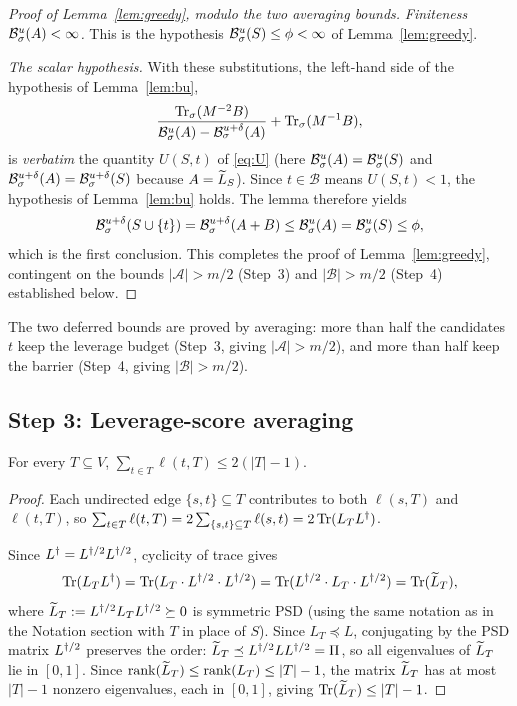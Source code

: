 \begin{proof}[Proof of Lemma~\ref{lem:greedy}, modulo the two averaging bounds]
\emph{Finiteness $\mathcal{B}^{u}_{\sigma}(A)<\infty$.} This is the hypothesis
$\mathcal{B}^{u}_{\sigma}(S)\le\phi<\infty$ of Lemma~\ref{lem:greedy}.

\emph{The scalar hypothesis.} With these substitutions, the left-hand side of
the hypothesis of Lemma~\ref{lem:bu},
\[
  \frac{\operatorname{Tr}_{\sigma}(M^{-2}B)}{\mathcal{B}^{u}_{\sigma}(A)-\mathcal{B}^{u+\delta}_{\sigma}(A)}
   + \operatorname{Tr}_{\sigma}(M^{-1}B),
\]
is \emph{verbatim} the quantity $U(S,t)$ of \eqref{eq:U}
(here $\mathcal{B}^{u}_{\sigma}(A)=\mathcal{B}^{u}_{\sigma}(S)$ and
$\mathcal{B}^{u+\delta}_{\sigma}(A)=\mathcal{B}^{u+\delta}_{\sigma}(S)$ because
$A=\widetilde{L}_S$). Since $t\in\mathcal{B}$ means $U(S,t)<1$, the hypothesis of
Lemma~\ref{lem:bu} holds. The lemma therefore yields
\[
  \mathcal{B}^{u+\delta}_{\sigma}(S\cup\{t\})
   =\mathcal{B}^{u+\delta}_{\sigma}(A+B)
   \le\mathcal{B}^{u}_{\sigma}(A)
   =\mathcal{B}^{u}_{\sigma}(S)\le\phi,
\]
which is the first conclusion. This completes the proof of
Lemma~\ref{lem:greedy}, contingent on the bounds $|\mathcal{A}|>m/2$
(Step~3) and $|\mathcal{B}|>m/2$ (Step~4) established below.
\end{proof}

\medskip
\noindent The two deferred bounds are proved by averaging: more than half the
candidates $t$ keep the leverage budget (Step~3, giving $|\mathcal{A}|>m/2$),
and more than half keep the barrier (Step~4, giving $|\mathcal{B}|>m/2$).

\subsection*{Step 3: Leverage-score averaging}

\begin{qsixclaim}\label{cl:Tlev}
For every $T\subseteq V$, $\sum_{t\in T}\ell(t,T)\le 2(|T|-1)$.
\end{qsixclaim}
\begin{proof}
Each undirected edge $\{s,t\}\subseteq T$ contributes to both $\ell(s,T)$ and
$\ell(t,T)$, so $\sum_{t\in T}\ell(t,T)=2\sum_{\{s,t\}\subseteq T}\ell(s,t)
=2\operatorname{Tr}(L_TL^{\dagger})$.

Since $L^{\dagger}=L^{\dagger/2}L^{\dagger/2}$, cyclicity of trace gives
\[
  \operatorname{Tr}(L_TL^{\dagger})
  =\operatorname{Tr}(L_T\cdot L^{\dagger/2}\cdot L^{\dagger/2})
  =\operatorname{Tr}(L^{\dagger/2}\cdot L_T\cdot L^{\dagger/2})
  =\operatorname{Tr}(\widetilde{L}_T),
\]
where $\widetilde{L}_T:=L^{\dagger/2} L_TL^{\dagger/2}\succeq 0$ is symmetric PSD (using the same
notation as in the Notation section with $T$ in place of $S$). Since $L_T\preceq L$,
conjugating by the PSD matrix $L^{\dagger/2}$ preserves the order:
$\widetilde{L}_T\preceq L^{\dagger/2} LL^{\dagger/2}=\Pi$, so all eigenvalues of $\widetilde{L}_T$ lie in
$[0,1]$. Since $\operatorname{rank}(\widetilde{L}_T)\le\operatorname{rank}(L_T)\le|T|-1$, the matrix $\widetilde{L}_T$
has at most $|T|-1$ nonzero eigenvalues, each in $[0,1]$, giving
$\operatorname{Tr}(\widetilde{L}_T)\le|T|-1$.
\end{proof}

